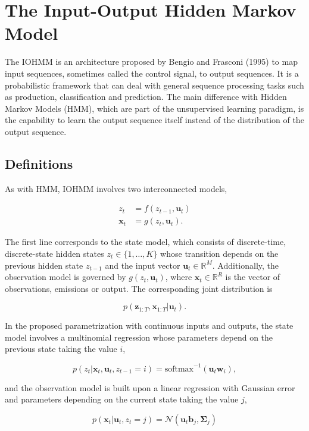 \documentclass[]{article}
\newcommand{\mat}[1]{\mathbf{#1}}
\newcommand{\RR}{\mathbb{R}}
\begin{document}
\section{The Input-Output Hidden Markov
Model}\label{the-input-output-hidden-markov-model}

The IOHMM is an architecture proposed by Bengio and Frasconi (1995) to
map input sequences, sometimes called the control signal, to output
sequences. It is a probabilistic framework that can deal with general
sequence processing tasks such as production, classification and
prediction. The main difference with Hidden Markov Models (HMM), which
are part of the unsupervised learning paradigm, is the capability to
learn the output sequence itself instead of the distribution of the
output sequence.

\subsection{Definitions}\label{definitions}

As with HMM, IOHMM involves two interconnected models,

\begin{align*}
z_{t} &= f(z_{t-1}, \mat{u}_{t}) \\
\mat{x}_{t} &= g(z_{t  }, \mat{u}_{t}).
\end{align*}

The first line corresponds to the state model, which consists of
discrete-time, discrete-state hidden states \(z_t \in \{1, \dots, K\}\)
whose transition depends on the previous hidden state \(z_{t-1}\) and
the input vector \(\mat{u}_{t} \in \RR^M\). Additionally, the
observation model is governed by \(g(z_{t}, \mat{u}_{t})\), where
\(\mat{x}_t \in \RR^R\) is the vector of observations, emissions or
output. The corresponding joint distribution is

\[
p(\mat{z}_{1:T}, \mat{x}_{1:T} | \mat{u}_{t}).
\]

In the proposed parametrization with continuous inputs and outputs, the
state model involves a multinomial regression whose parameters depend on
the previous state taking the value \(i\),

\[
p(z_t | \mat{x}_{t}, \mat{u}_{t}, z_{t-1} = i) = \text{softmax}^{-1}(\mat{u}_{t} \mat{w}_i),
\]

and the observation model is built upon a linear regression with
Gaussian error and parameters depending on the current state taking the
value \(j\),

\[
p(\mat{x}_t | \mat{u}_{t}, z_{t} = j) = \mathcal{N}(\mat{u}_t \mat{b}_j, \mat{\Sigma}_j)
\]
\end{document}
